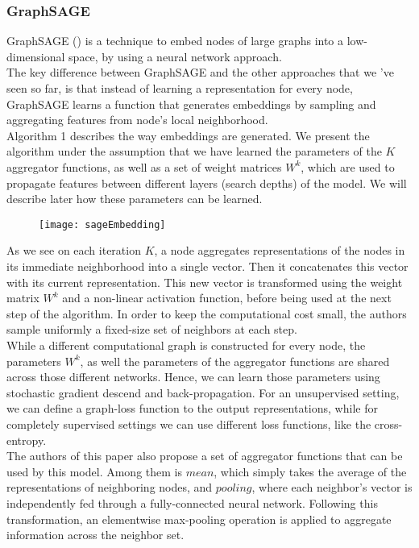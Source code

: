 \subsubsection*{GraphSAGE}
GraphSAGE (\cite{hamilton2017inductive}) is a technique to embed nodes of large graphs into a
low-dimensional space, by using a neural network approach.\\
The key difference between GraphSAGE and the other approaches that we 've seen
so far, is that instead of learning a representation for every node, GraphSAGE
learns a function that generates embeddings by sampling and aggregating features
from node's local neighborhood.\\
 Algorithm 1 describes the way
embeddings are generated. We present the algorithm under the assumption that
we have learned the parameters of the $K$ aggregator functions, as well as a
set of weight matrices $W^k$, which are used to propagate features between
different layers (search depths) of the model. We will describe later how these
parameters can be learned.
\begin{figure}[h!tb]
\texttt{[image: sageEmbedding]}
\label{algo}
\end{figure}
As we see on each iteration $K$, a node aggregates representations of the nodes
in its immediate neighborhood into a single vector. Then it concatenates this
vector with its current representation. This new vector is transformed using the weight matrix
$W^k$ and a non-linear activation function, before being used at the next step
of the algorithm. In order to keep the computational cost small, the authors
sample uniformly a fixed-size set of neighbors at each step.\\
 While a different computational graph is
constructed for every node, the parameters $W^k$, as well the parameters of the
aggregator functions are shared across those different networks. Hence, we can
learn those parameters using stochastic gradient descend and back-propagation.
For an unsupervised setting, we can define a graph-loss function to the output
representations, while for completely supervised settings we can use different
loss functions, like the cross-entropy.\\
 The authors of this paper also propose a set of
aggregator functions that can be used by this model. Among them is $mean$, which
simply takes the average of the representations of neighboring nodes, and
$pooling$, where each neighbor's vector is independently fed through a
fully-connected neural network. Following this transformation, an elementwise
max-pooling operation is applied to aggregate information across the neighbor
set.
